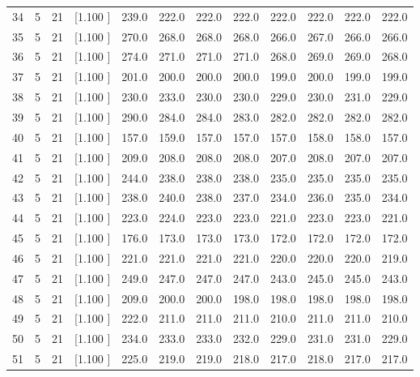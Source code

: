 \documentclass[12pt,a4paper]{article}
\begin{document}
\begin{center}
{\begin{tabular}{r r r r r r r r r r r r}
  34&  5& 21&[1.100     ]&   239.0&   222.0&   222.0&   222.0&   222.0&   222.0&   222.0&   222.0\\[-0.02in]
  35&  5& 21&[1.100     ]&   270.0&   268.0&   268.0&   268.0&   266.0&   267.0&   266.0&   266.0\\[-0.02in]
  36&  5& 21&[1.100     ]&   274.0&   271.0&   271.0&   271.0&   268.0&   269.0&   269.0&   268.0\\[-0.02in]
  37&  5& 21&[1.100     ]&   201.0&   200.0&   200.0&   200.0&   199.0&   200.0&   199.0&   199.0\\[-0.02in]
  38&  5& 21&[1.100     ]&   230.0&   233.0&   230.0&   230.0&   229.0&   230.0&   231.0&   229.0\\[-0.02in]
  39&  5& 21&[1.100     ]&   290.0&   284.0&   284.0&   283.0&   282.0&   282.0&   282.0&   282.0\\[-0.02in]
  40&  5& 21&[1.100     ]&   157.0&   159.0&   157.0&   157.0&   157.0&   158.0&   158.0&   157.0\\[-0.02in]
  41&  5& 21&[1.100     ]&   209.0&   208.0&   208.0&   208.0&   207.0&   208.0&   207.0&   207.0\\[-0.02in]
  42&  5& 21&[1.100     ]&   244.0&   238.0&   238.0&   238.0&   235.0&   235.0&   235.0&   235.0\\[-0.02in]
  43&  5& 21&[1.100     ]&   238.0&   240.0&   238.0&   237.0&   234.0&   236.0&   235.0&   234.0\\[-0.02in]
  44&  5& 21&[1.100     ]&   223.0&   224.0&   223.0&   223.0&   221.0&   223.0&   223.0&   221.0\\[-0.02in]
  45&  5& 21&[1.100     ]&   176.0&   173.0&   173.0&   173.0&   172.0&   172.0&   172.0&   172.0\\[-0.02in]
  46&  5& 21&[1.100     ]&   221.0&   221.0&   221.0&   221.0&   220.0&   220.0&   220.0&   219.0\\[-0.02in]
  47&  5& 21&[1.100     ]&   249.0&   247.0&   247.0&   247.0&   243.0&   245.0&   245.0&   243.0\\[-0.02in]
  48&  5& 21&[1.100     ]&   209.0&   200.0&   200.0&   198.0&   198.0&   198.0&   198.0&   198.0\\[-0.02in]
  49&  5& 21&[1.100     ]&   222.0&   211.0&   211.0&   211.0&   210.0&   211.0&   211.0&   210.0\\[-0.02in]
  50&  5& 21&[1.100     ]&   234.0&   233.0&   233.0&   232.0&   229.0&   231.0&   231.0&   229.0\\[-0.02in]
  51&  5& 21&[1.100     ]&   225.0&   219.0&   219.0&   218.0&   217.0&   218.0&   217.0&   217.0\\[-0.02in]

\end{tabular}}
\end{center}
\end{document}
